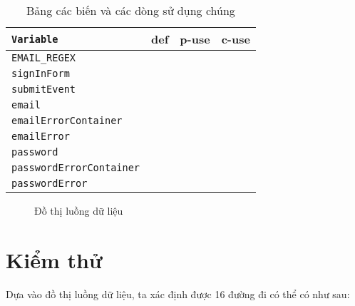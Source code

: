 \documentclass{article}
\begin{document}
\begin{table}[htp]
    \centering
    \begin{tabular}{l|c|c|c}
        \texttt{Variable}               & def & p-use & c-use \\
        \toprule
        \bottomrule
        \texttt{EMAIL\_REGEX}           &     &       &       \\
        \hline
        \texttt{signInForm}             &     &       &       \\
        \hline
        \texttt{submitEvent}            &     &       &       \\
        \hline
        \texttt{email}                  &     &       &       \\
        \hline
        \texttt{emailErrorContainer}    &     &       &       \\
        \hline
        \texttt{emailError}             &     &       &       \\
        \hline
        \texttt{password}               &     &       &       \\
        \hline
        \texttt{passwordErrorContainer} &     &       &       \\
        \hline
        \texttt{passwordError}          &     &       &       \\
    \end{tabular}
    \caption{Bảng các biến và các dòng sử dụng chúng}
\end{table}

\begin{figure}[htp]
    \centering
    \caption{Đồ thị luồng dữ liệu}
\end{figure}

\section{Kiểm thử}

\par Dựa vào đồ thị luồng dữ liệu, ta xác định được 16 đường đi có thể có như sau:
\bigskip
\end{document}
